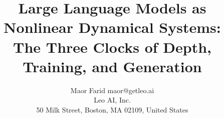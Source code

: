 \documentclass[10pt]{article}
\title{Large Language Models as Nonlinear Dynamical Systems:\\ The Three Clocks of Depth, Training, and Generation}
\author{\name Maor Farid \email maor@getleo.ai \\
      \addr Leo AI, Inc.\\
      50 Milk Street, Boston, MA 02109, United States}
\theoremstyle{definition}
\theoremstyle{remark}
\begin{document}
\maketitle

\begin{abstract}

\end{abstract}









{\small\setlength{\bibsep}{2pt plus 0.5pt}
}


\appendix




\end{document}
